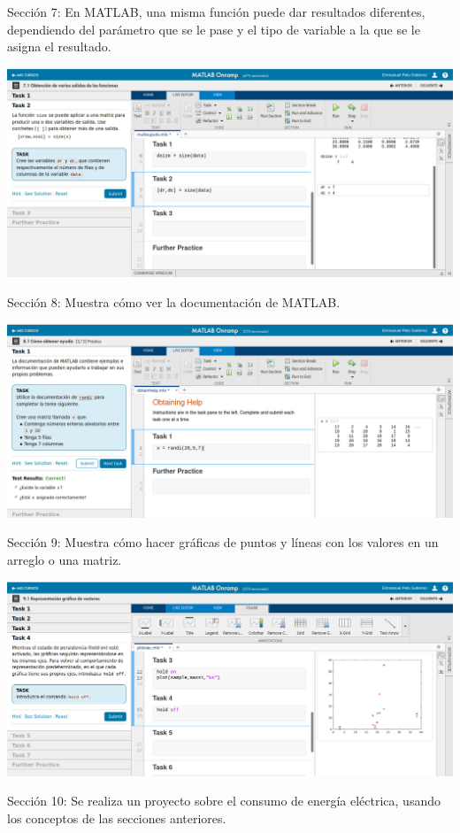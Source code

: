 \documentclass{article}
\begin{document}
Sección 7: En MATLAB, una misma función puede dar resultados diferentes, dependiendo del parámetro que se le pase y el tipo de variable a la que se le asigna el resultado.

\includegraphics[width=\linewidth]{imagenes/7}

Sección 8: Muestra cómo ver la documentación de MATLAB.

\includegraphics[width=\linewidth]{imagenes/8}

Sección 9: Muestra cómo hacer gráficas de puntos y líneas con los valores en un arreglo o una matriz.

\includegraphics[width=\linewidth]{imagenes/9}

Sección 10: Se realiza un proyecto sobre el consumo de energía eléctrica, usando los conceptos de las secciones anteriores.
\end{document}
